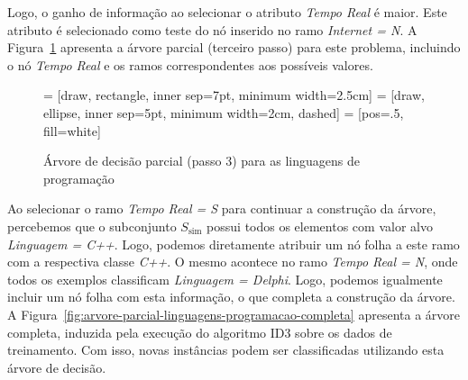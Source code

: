 Logo, o ganho de informação ao selecionar o atributo \textit{Tempo Real} é maior. Este atributo é selecionado como teste do nó inserido no ramo \textit{Internet = N}. A Figura~\ref{fig:arvore-parcial-linguagens-programacao-3} apresenta a árvore parcial (terceiro passo) para este problema, incluindo o nó \textit{Tempo Real} e os ramos correspondentes aos possíveis valores.

\begin{figure}[h]
	\centering
	 = [draw, rectangle, inner sep=7pt, minimum width=2.5cm]
	 = [draw, ellipse, inner sep=5pt, minimum width=2cm, dashed]
	 = [pos=.5, fill=white]
	
	
	\caption{Árvore de decisão parcial (passo 3) para as linguagens de programação}
	\label{fig:arvore-parcial-linguagens-programacao-3}
\end{figure}

Ao selecionar o ramo \textit{Tempo Real = S} para continuar a construção da árvore, percebemos que o subconjunto $S_\text{sim}$ possui todos os elementos com valor alvo \textit{Linguagem = C++}. Logo, podemos diretamente atribuir um nó folha a este ramo com a respectiva classe \textit{C++}. O mesmo acontece no ramo \textit{Tempo Real = N}, onde todos os exemplos classificam \textit{Linguagem = Delphi}. Logo, podemos igualmente incluir um nó folha com esta informação, o que completa a construção da árvore. A Figura~\ref{fig:arvore-parcial-linguagens-programacao-completa} apresenta a árvore completa, induzida pela execução do algoritmo ID3 sobre os dados de treinamento. Com isso, novas instâncias podem ser classificadas utilizando esta árvore de decisão.

